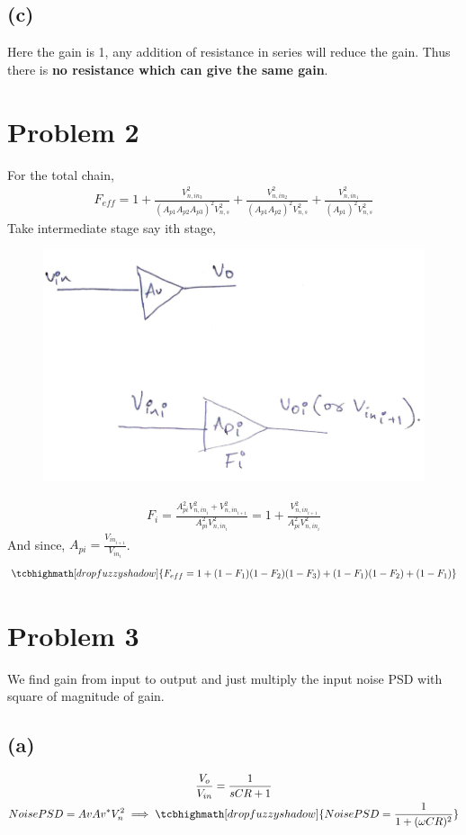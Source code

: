 \documentclass{article}
\begin{document}
\subsection*{(c)}
Here the gain is 1, any addition of resistance in series will reduce the gain. Thus there is \textbf{no resistance which can give the same gain}.
\section*{\hfil Problem 2}
For the total chain,
\begin{gather*}
	F_{eff} = 1 + \frac{V_{n, in_{3}}^2}{(A_{p1}A_{p2}A_{p3})^2V_{n, s}^2} + \frac{V_{n, in_{2}}^2}{(A_{p1}A_{p2})^2V_{n, s}^2} + \frac{V_{n, in_{1}}^2}{(A_{p1})^2V_{n, s}^2}
\end{gather*}
Take intermediate stage say ith stage,
\begin{figure}[H]
	\centering
	\includegraphics[scale=0.4]{./figs/2.png}
\end{figure}
\begin{gather*}
	F_i = \frac{A_{pi}^2V_{n, in_i}^2 + V_{n, in_{i+1}}^2}{A_{pi}^2V_{n, in_i}^2} = 1 + \frac{V_{n, in_{i+1}}^2}{A_{pi}^2V_{n, in_i}^2}
\end{gather*}
And since, $A_{pi} = \frac{V_{in_{i+1}}}{V_{in_{i}}}$.
\begin{gather*}
	\tcbhighmath[drop fuzzy shadow]{F_{eff} = 1 + (1-F_1)(1-F_2)(1-F_3) + (1-F_1)(1-F_2) + (1-F_1)}
\end{gather*}
\section*{\hfil Problem 3}
We find gain from input to output and just multiply the input noise PSD with square of magnitude of gain.
\subsection*{(a)}
\begin{gather*}
	\frac{V_o}{V_{in}} = \frac{1}{sCR + 1}\\
	Noise PSD = AvAv^*V_n^2
	\implies \tcbhighmath[drop fuzzy shadow]{NoisePSD = \frac{1}{1 + (\omega CR)^2}}
\end{gather*}
\end{document}

